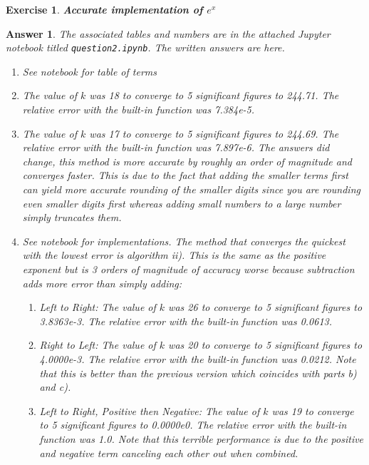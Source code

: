 \documentclass[12pt]{article}
\theoremstyle{colon}
\newtheorem{exercise}{Exercise}
\newtheorem*{answer}{Answer}
\begin{document}
\clearpage

\begin{exercise}
  \textbf{Accurate implementation of $e^x$}
\end{exercise}

\begin{answer}
  The associated tables and numbers are in the attached Jupyter notebook titled \texttt{question2.ipynb}. The written answers are here.

  \begin{enumerate}[label=\alph*)]
    \item See notebook for table of terms

    \item The value of $k$ was 18 to converge to 5 significant figures to 244.71. The relative error with the built-in function was 7.384e-5.

    \item The value of $k$ was 17 to converge to 5 significant figures to 244.69. The relative error with the built-in function was 7.897e-6. The answers did change, this method is more accurate by roughly an order of magnitude and converges faster. This is due to the fact that adding the smaller terms first can yield more accurate rounding of the smaller digits since you are rounding even smaller digits first whereas adding small numbers to a large number simply truncates them.

    \item See notebook for implementations. The method that converges the quickest with the lowest error is algorithm ii). This is the same as the positive exponent but is 3 orders of magnitude of accuracy worse because subtraction adds more error than simply adding:

      \begin{enumerate}[label=\roman*)]
        \item Left to Right: The value of $k$ was 26 to converge to 5 significant figures to 3.8363e-3. The relative error with the built-in function was 0.0613.

        \item Right to Left: The value of $k$ was 20 to converge to 5 significant figures to 4.0000e-3. The relative error with the built-in function was 0.0212. Note that this is better than the previous version which coincides with parts b) and c).

        \item Left to Right, Positive then Negative: The value of $k$ was 19 to converge to 5 significant figures to 0.0000e0. The relative error with the built-in function was 1.0. Note that this terrible performance is due to the positive and negative term canceling each other out when combined.


\end{enumerate}
\end{enumerate}
\end{answer}
\end{document}
